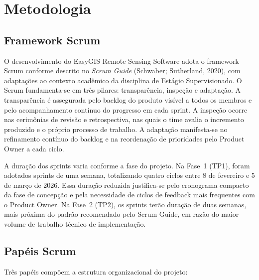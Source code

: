 \documentclass[12pt, a4paper]{article}
\begin{document}
\section{Metodologia}

\subsection{Framework Scrum}

O desenvolvimento do EasyGIS Remote Sensing Software adota o framework Scrum conforme descrito no \textit{Scrum Guide} (Schwaber; Sutherland, 2020), com adaptações ao contexto acadêmico da disciplina de Estágio Supervisionado. O Scrum fundamenta-se em três pilares: transparência, inspeção e adaptação. A transparência é assegurada pelo backlog do produto visível a todos os membros e pelo acompanhamento contínuo do progresso em cada sprint. A inspeção ocorre nas cerimônias de revisão e retrospectiva, nas quais o time avalia o incremento produzido e o próprio processo de trabalho. A adaptação manifesta-se no refinamento contínuo do backlog e na reordenação de prioridades pelo Product Owner a cada ciclo.

A duração dos sprints varia conforme a fase do projeto. Na Fase~1 (TP1), foram adotados sprints de uma semana, totalizando quatro ciclos entre 8 de fevereiro e 5 de março de 2026. Essa duração reduzida justifica-se pelo cronograma compacto da fase de concepção e pela necessidade de ciclos de feedback mais frequentes com o Product Owner. Na Fase~2 (TP2), os sprints terão duração de duas semanas, mais próxima do padrão recomendado pelo Scrum Guide, em razão do maior volume de trabalho técnico de implementação.

\subsection{Papéis Scrum}

Três papéis compõem a estrutura organizacional do projeto:
\end{document}
